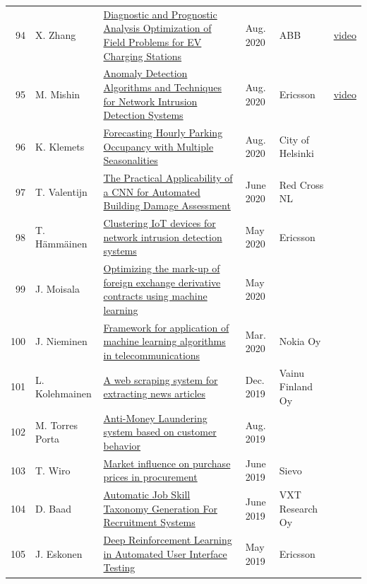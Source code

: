\documentclass[11pt,a4paper]{article}
\begin{document}
\begin{longtable}{@{}r p{2.8cm} p{6.3cm} p{1.6cm} p{2cm} p{1.8cm}@{}}
94 & X. Zhang & \href{https://aaltodoc.aalto.fi/handle/123456789/46045}{Diagnostic and Prognostic Analysis Optimization of Field Problems for EV Charging Stations} & Aug. 2020 & ABB & \href{https://youtu.be/4y6AsFaC9iQ}{video} \\
95 & M. Mishin & \href{https://aaltodoc.aalto.fi/handle/123456789/46076}{Anomaly Detection Algorithms and Techniques for Network Intrusion Detection Systems} & Aug. 2020 & Ericsson & \href{https://youtu.be/Z_lBOjkaSPk}{video} \\
96 & K. Klemets & \href{https://aaltodoc.aalto.fi/handle/123456789/45990}{Forecasting Hourly Parking Occupancy with Multiple Seasonalities} & Aug. 2020 & City of Helsinki &  \\
97 & T. Valentijn & \href{https://aaltodoc.aalto.fi/handle/123456789/44991}{The Practical Applicability of a CNN for Automated Building Damage Assessment} & June 2020 & Red Cross NL &  \\
98 & T. Hämmäinen & \href{https://aaltodoc.aalto.fi/handle/123456789/44266}{Clustering IoT devices for network intrusion detection systems} & May 2020 & Ericsson &  \\
99 & J. Moisala & \href{https://aaltodoc.aalto.fi/handle/123456789/44353}{Optimizing the mark-up of foreign exchange derivative contracts using machine learning} & May 2020 &  &  \\
100 & J. Nieminen & \href{https://aaltodoc.aalto.fi/handle/123456789/43572}{Framework for application of machine learning algorithms in telecommunications} & Mar. 2020 & Nokia Oy &  \\
101 & L. Kolehmainen & \href{https://aaltodoc.aalto.fi/handle/123456789/41693}{A web scraping system for extracting news articles} & Dec. 2019 & Vainu Finland Oy &  \\
102 & M. Torres Porta & \href{https://aaltodoc.aalto.fi/handle/123456789/39938}{Anti-Money Laundering system based on customer behavior} & Aug. 2019 &  &  \\
103 & T. Wiro & \href{https://aaltodoc.aalto.fi/handle/123456789/39059}{Market influence on purchase prices in procurement} & June 2019 & Sievo &  \\
104 & D. Baad & \href{https://aaltodoc.aalto.fi/handle/123456789/38986}{Automatic Job Skill Taxonomy Generation For Recruitment Systems} & June 2019 & VXT Research Oy &  \\
105 & J. Eskonen & \href{https://aaltodoc.aalto.fi/handle/123456789/37895}{Deep Reinforcement Learning in Automated User Interface Testing} & May 2019 & Ericsson &  \\

\end{longtable}
\end{document}
